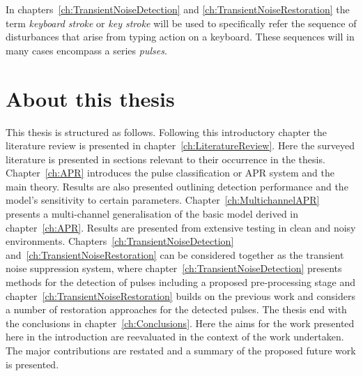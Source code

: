 In chapters~\ref{ch:TransientNoiseDetection} and \ref{ch:TransientNoiseRestoration} the term \emph{keyboard stroke} or \emph{key stroke} will be used to specifically refer the sequence of disturbances that arise from typing action on a keyboard. These sequences will in many cases encompass a series \emph{pulses}.

\section{About this thesis}
This thesis is structured as follows. Following this introductory chapter the literature review is presented in chapter~\ref{ch:LiteratureReview}. Here the surveyed literature is presented in sections relevant to their occurrence in the thesis. Chapter~\ref{ch:APR} introduces the pulse classification or APR system and the main theory. Results are also presented outlining detection performance and the model's sensitivity to certain parameters. Chapter~\ref{ch:MultichannelAPR} presents a multi-channel generalisation of the basic model derived in chapter~\ref{ch:APR}. Results are presented from extensive testing in clean and noisy environments. Chapters~\ref{ch:TransientNoiseDetection} and~\ref{ch:TransientNoiseRestoration} can be considered together as the transient noise suppression system, where chapter~\ref{ch:TransientNoiseDetection} presents methods for the detection of pulses including a proposed pre-processing stage and chapter~\ref{ch:TransientNoiseRestoration} builds on the previous work and considers a number of restoration approaches for the detected pulses. The thesis end with the conclusions in chapter~\ref{ch:Conclusions}. Here the aims for the work presented here in the introduction are reevaluated in the context of the work undertaken. The major contributions are restated and a summary of the proposed future work is presented.



